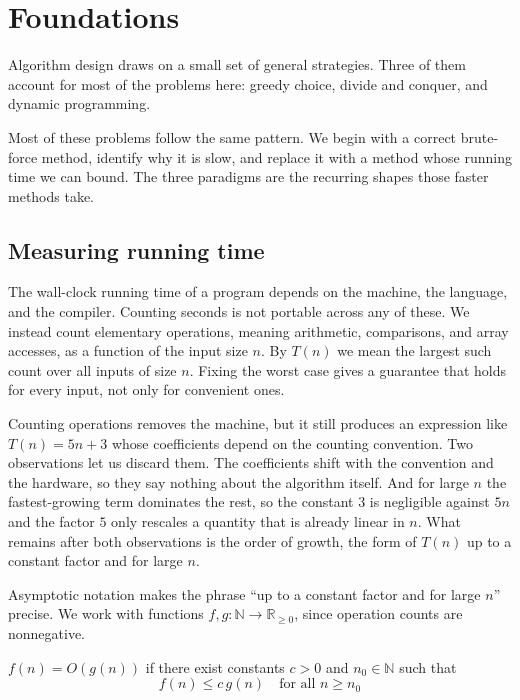 \section{Foundations}

Algorithm design draws on a small set of general strategies. Three of them account for most of the problems here: greedy choice, divide and conquer, and dynamic programming.

Most of these problems follow the same pattern. We begin with a correct brute-force method, identify why it is slow, and replace it with a method whose running time we can bound. The three paradigms are the recurring shapes those faster methods take.

\subsection*{Measuring running time}

The wall-clock running time of a program depends on the machine, the language, and the compiler. Counting seconds is not portable across any of these. We instead count elementary operations, meaning arithmetic, comparisons, and array accesses, as a function of the input size $n$. By $T(n)$ we mean the largest such count over all inputs of size $n$. Fixing the worst case gives a guarantee that holds for every input, not only for convenient ones.

Counting operations removes the machine, but it still produces an expression like $T(n) = 5n + 3$ whose coefficients depend on the counting convention. Two observations let us discard them. The coefficients shift with the convention and the hardware, so they say nothing about the algorithm itself. And for large $n$ the fastest-growing term dominates the rest, so the constant $3$ is negligible against $5n$ and the factor $5$ only rescales a quantity that is already linear in $n$. What remains after both observations is the order of growth, the form of $T(n)$ up to a constant factor and for large $n$.

Asymptotic notation makes the phrase ``up to a constant factor and for large $n$'' precise. We work with functions $f, g \colon \mathbb{N} \to \mathbb{R}_{\ge 0}$, since operation counts are nonnegative.

\medskip

\begin{definition}[Big-O]
$f(n) = O(g(n))$ if there exist constants $c > 0$ and $n_0 \in \mathbb{N}$ such that
\[
  f(n) \le c\,g(n) \quad\text{for all } n \ge n_0
\]
\end{definition}

